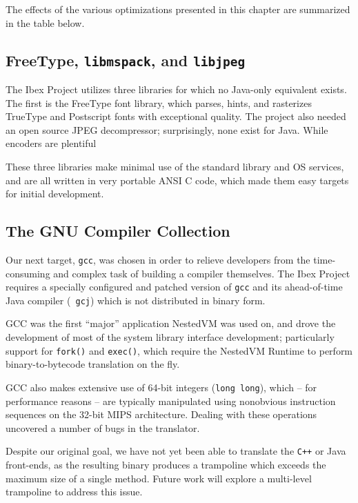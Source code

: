 \documentclass{acmconf}
\begin{document}
The effects of the various optimizations presented in this chapter are
summarized in the table below.




\subsection{FreeType, {\tt libmspack}, and {\tt libjpeg}}

The Ibex Project utilizes three libraries for which no Java-only
equivalent exists.  The first is the FreeType font library, which
parses, hints, and rasterizes TrueType and Postscript fonts with
exceptional quality.  The project also needed an open source JPEG
decompressor; surprisingly, none exist for Java.  While encoders are
plentiful

These three libraries make minimal use of the standard library and OS
services, and are all written in very portable ANSI C code, which made
them easy targets for initial development.

\subsection{The GNU Compiler Collection}

Our next target, {\tt gcc}, was chosen in order to relieve developers
from the time-consuming and complex task of building a compiler
themselves.  The Ibex Project requires a specially configured and
patched version of {\tt gcc} and its ahead-of-time Java compiler ({\tt
gcj}) which is not distributed in binary form.

GCC was the first ``major'' application NestedVM was used on, and
drove the development of most of the system library interface
development; particularly support for {\tt fork()} and {\tt exec()},
which require the NestedVM Runtime to perform binary-to-bytecode
translation on the fly.

GCC also makes extensive use of 64-bit integers ({\tt long long}),
which -- for performance reasons -- are typically manipulated using
nonobvious instruction sequences on the 32-bit MIPS architecture.
Dealing with these operations uncovered a number of bugs in the
translator.

Despite our original goal, we have not yet been able to translate the
{\tt C++} or Java front-ends, as the resulting binary produces a
trampoline which exceeds the maximum size of a single method.  Future
work will explore a multi-level trampoline to address this issue.
\end{document}
